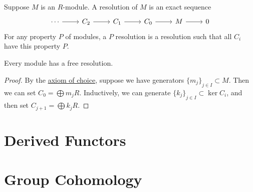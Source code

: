 \begin{definition}
    Suppose \(M\) is an \(R\)-module.
    A resolution of \(M\) is an exact sequence
    \begin{equation*}
        \begin{tikzcd}
            \cdots \arrow{r} & C_2 \arrow{r} & C_1 \arrow{r} & C_0 \arrow{r} &
            M \arrow{r} & 0
        \end{tikzcd}
    \end{equation*}
    For any property \(P\) of modules,
    a \(P\) resolution is a resolution such that all \(C_i\) have this property \(P\).
\end{definition}
\begin{lemma}
    Every module has a free resolution.
\end{lemma}
\begin{proof}
    By the \hyperref[ax:choice]{axiom of choice},
    suppose we have generators \({\{m_j\}}_{j \in I} \subset M\).
    Then we can set \(C_0 = \bigoplus m_j R\).
    Inductively, we can generate \({\{k_j\}}_{j \in I} \subset \ker C_i\),
    and then set \(C_{j+1} = \bigoplus k_j R\).
\end{proof}


\section{Derived Functors}


\section{Group Cohomology}
